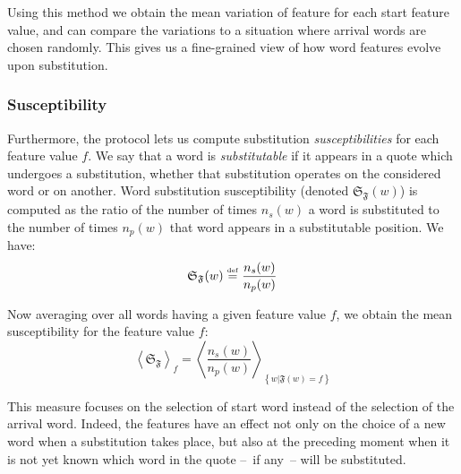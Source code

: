 Using this method we obtain the mean variation of feature for each start feature value, and can compare the variations to a situation where arrival words are chosen randomly. This gives us a fine-grained view of how word features evolve upon substitution.


\subsubsection{Susceptibility}


Furthermore, the protocol lets us compute substitution \emph{susceptibilities} for each feature value $f$. 
We say that a word is \emph{substitutable} if it appears in a quote which undergoes a substitution, whether that substitution operates on the considered word or on another. 
Word substitution susceptibility (denoted $\mathfrak{S}_{\mathfrak{F}}(w)$) is computed as the ratio of the number of times $n_s(w)$ a word is substituted to the number of times $n_p(w)$ that word appears in a substitutable position.  We have:
$$\mathfrak{S}_{\mathfrak{F}}(w) \overset{\underset{\mathrm{def}}{}}{=} \frac{n_s(w)}{n_p(w)}$$

Now averaging over all words having a given feature value $f$, we obtain the mean susceptibility for the feature value $f$:
$$\left< \mathfrak{S}_{\mathfrak{F}} \right>_f = \left< \frac{n_s(w)}{n_p(w)} \right>_{\left\lbrace w | \mathfrak{F}(w) = f \right\rbrace}$$

This measure focuses on the selection of start word instead of the selection of the arrival word. Indeed, the features have an effect not only on the choice of a new word when a substitution takes place, but also at the preceding moment when it is not yet known which word in the quote --~if any~-- will be substituted. 


